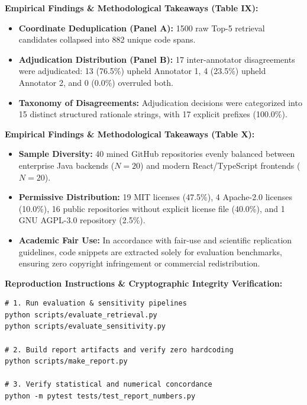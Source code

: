\documentclass[11pt,a4paper,landscape]{article}
\begin{document}

\FloatBarrier
\vspace{-0.1cm}
{\small
\noindent\textbf{Empirical Findings \& Methodological Takeaways (Table IX):}
\begin{itemize}[nosep,topsep=2pt,partopsep=0pt,itemsep=2pt]
    \item \textbf{Coordinate Deduplication (Panel A):} 1500 raw Top-5 retrieval candidates collapsed into 882 unique code spans.
    \item \textbf{Adjudication Distribution (Panel B):} 17 inter-annotator disagreements were adjudicated: 13 (76.5\%) upheld Annotator 1, 4 (23.5\%) upheld Annotator 2, and 0 (0.0\%) overruled both.
    \item \textbf{Taxonomy of Disagreements:} Adjudication decisions were categorized into 15 distinct structured rationale strings, with 17 explicit prefixes (100.0\%).
\end{itemize}
}
\clearpage


\FloatBarrier
\vspace{-0.1cm}
{\small
\noindent\textbf{Empirical Findings \& Methodological Takeaways (Table X):}
\begin{itemize}[nosep,topsep=2pt,partopsep=0pt,itemsep=2pt]
    \item \textbf{Sample Diversity:} 40 mined GitHub repositories evenly balanced between enterprise Java backends ($N=20$) and modern React/TypeScript frontends ($N=20$).
    \item \textbf{Permissive Distribution:} 19 MIT licenses (47.5\%), 4 Apache-2.0 licenses (10.0\%), 16 public repositories without explicit license file (40.0\%), and 1 GNU AGPL-3.0 repository (2.5\%).
    \item \textbf{Academic Fair Use:} In accordance with fair-use and scientific replication guidelines, code snippets are extracted solely for evaluation benchmarks, ensuring zero copyright infringement or commercial redistribution.
\end{itemize}
}
\clearpage

\appendix
{}

\FloatBarrier
\vspace{0.2cm}
{\small
\noindent\textbf{Reproduction Instructions \& Cryptographic Integrity Verification:}
\begin{verbatim}
# 1. Run evaluation & sensitivity pipelines
python scripts/evaluate_retrieval.py
python scripts/evaluate_sensitivity.py

# 2. Build report artifacts and verify zero hardcoding
python scripts/make_report.py

# 3. Verify statistical and numerical concordance
python -m pytest tests/test_report_numbers.py
\end{verbatim}
}
\end{document}
